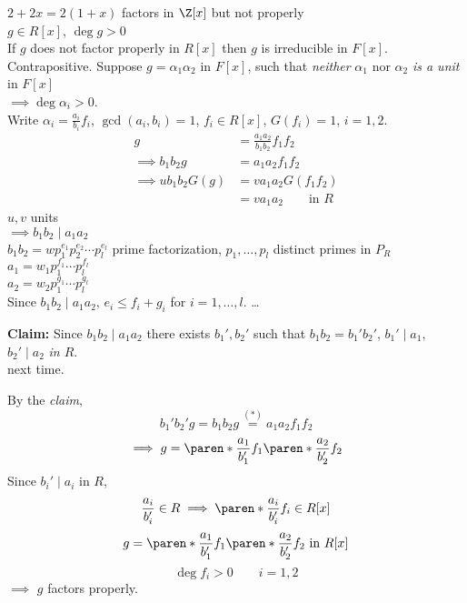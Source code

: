 $2+2x=2(1+x)$ factors in $\Z[x]$ but not properly \\
\prop $g\in R[x]$, $\deg g>0$ \\
If $g$ does not factor properly in $R[x]$ then $g$ is irreducible in $F[x]$. \\
\pf Contrapositive.  Suppose $g=\alpha_1\alpha_2$ in $F[x]$, such that \emph{neither} $\alpha_1$ nor $\alpha_2$ \emph{is a unit} in $F[x]$ \\
$\implies\deg\alpha_i>0$. \\
Write $\alpha_i=\frac{a_i}{b_i}f_i$, $\gcd(a_i,b_i)=1$, $f_i\in R[x]$, $G(f_i)=1$, $i=1,2$.
\begin{align*}
g &= \frac{a_1a_2}{b_1b_2}f_1f_2 \\
\implies b_1b_2g &= a_1a_2f_1f_2 \tag{$*$}\label{star} \\
\implies ub_1b_2 G(g) &= va_1a_2G(f_1f_2) \\
&= va_1a_2\qquad\text{in $R$}
\end{align*}
$u,v$ units \\
$\implies b_1b_2\mid a_1a_2$ \\
$b_1b_2=wp_1^{e_1}p_2^{e_2}\dotsm p_l^{e_l}$ prime factorization, $p_1,\dotsc,p_l$ distinct primes in $P_R$
$a_1 = w_1p_1^{f_1}\dotsm p_l^{f_l}$ \\
$a_2 = w_2p_1^{g_1}\dotsm p_l^{g_l}$ \\
Since $b_1b_2\mid a_1a_2$, $e_i\leq f_i+g_i$ for $i=1,\dotsc,l$. \ldots

\textbf{Claim: }Since $b_1b_2\mid a_1a_2$ there exists $b_1',b_2'$ such that $b_1b_2=b_1'b_2'$, $b_1'\mid a_1$, $b_2'\mid a_2$ \emph{in $R$}. \\
\pf next time.

By the \emph{claim},
\[ b_1'b_2'g = b_1b_2g \overset{(*)}{=} a_1a_2f_1f_2 \]
\[ \implies g = \paren*{\frac{a_1}{b_1'}f_1}\paren*{\frac{a_2}{b_2'}f_2} \]
Since $b_i'\mid a_i$ in $R$,
\[ \frac{a_i}{b_i'} \in R \implies \paren*{\frac{a_i}{b_i'}f_i} \in R[x] \]
\[ g = \paren*{\frac{a_1}{b_1'}f_1}\paren*{\frac{a_2}{b_2'}f_2}\text{ in $R[x]$} \]
\[ \deg f_i>0 \qquad i=1,2 \]
$\implies$ $g$ factors properly.

